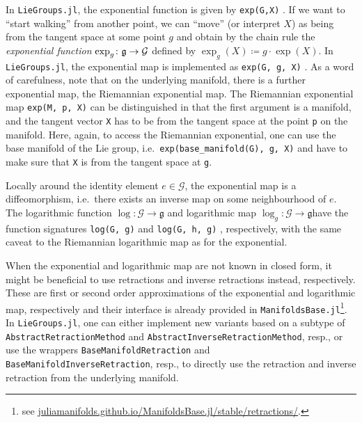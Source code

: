 \documentclass{juliacon}
\newcommand{\term}[1]{\emph{#1}}
\begin{document}
In \verb|LieGroups.jl|, the exponential function is given by \verb|exp(G,X)|%
.
If we want to “start walking” from another point, we can “move” (or interpret $X$) as being from the tangent space at some point $g$ and obtain by the chain rule the \term{exponential function} $\exp_g\colon\frak g\to\mathcal G$ defined by $\exp_g(X)\coloneqq g \cdot \exp(X)$.
In \verb|LieGroups.jl|, the exponential map is implemented as \verb|exp(G, g, X)|%
.
As a word of carefulness, note that on the underlying manifold, there is a further exponential map, the Riemannian exponential map. The Riemannian exponential map \verb|exp(M, p, X)|
can be distinguished in that the first argument is a manifold, and the tangent vector \verb|X| has to be from the tangent space at the point \verb|p| on the manifold.
Here, again, to access the Riemannian exponential, one can use the base manifold of the Lie group, i.e.\ \verb|exp(base_manifold(G), g, X)| and have to make sure that \verb|X| is from the tangent space at \verb|g|.

Locally around the identity element $e\in\mathcal G$, the exponential map is a diffeomorphism, i.e.\ there exists an inverse map on some neighbourhood of $e$. The logarithmic function \(\log\colon \mathcal{G} \to \mathfrak{g}\) and logarithmic map \(\log_g\colon \mathcal{G} \to \mathfrak{g}\)have the function signatures \verb|log(G, g)|%
and \verb|log(G, h, g)|%
, respectively, with the same caveat to the Riemannian logarithmic map as for the exponential.

When the exponential and logarithmic map are not known in closed form, it might be beneficial to use retractions and inverse retractions instead, respectively.
These are first or second order approximations of the exponential and logarithmic map, respectively and their interface is already provided in \verb|ManifoldsBase.jl|\footnote{see \href{https://juliamanifolds.github.io/ManifoldsBase.jl/stable/retractions/}{juliamanifolds.github.io/ManifoldsBase.jl/stable/retractions/}.}.
In \verb|LieGroups.jl|, one can either implement new variants based on a subtype of \verb|AbstractRetractionMethod| and \verb|AbstractInverseRetractionMethod|, resp., or use the wrappers \verb|BaseManifoldRetraction| and \verb|BaseManifoldInverseRetraction|, resp., to directly use the retraction and inverse retraction from the underlying manifold.
\end{document}
